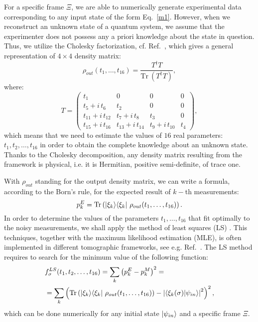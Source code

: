 \documentclass[aps,pra,reprint,groupedaddress,showkeys]{revtex4-1}
\renewcommand{\eqref}[1]{Eq.~\ref{#1}}
\newcommand{\tr}{{\mathrm{Tr}}}
\begin{document}
For a specific frame $\Xi$, we are able to numerically generate experimental data corresponding to any input state of the form \eqref{m1}. However, when we reconstruct an unknown state of a quantum system, we assume that the experimenter does not possess any a priori knowledge about the state in question. Thus, we utilize the Cholesky factorization, cf. Ref.~\cite{James2001,Altepeter2005,SedziakKacprowicz2020}, which gives a general representation of $4\times4$ density matrix:
\begin{equation}\label{m5}
\rho_{out} (t_1, \dots, t_{16}) = \frac{T^{\dagger} T}{\tr\: \left(T^{\dagger} T\right)},
\end{equation}
where:
\begin{equation}\label{m6}
T=\begin{pmatrix} t_1 & 0 & 0 &0 \\ t_5 + i\, t_6 & t_2 & 0 &0 \\  t_{11} + i \,t_{12} & t_7 + i\, t_8 & t_3 &0 \\ t_{15} + i\, t_{16} & t_{13} + i\, t_{14} & t_9 + i\, t_{10} & t_4 \end{pmatrix},
\end{equation}
which means that we need to estimate the values of $16$ real parameters: $t_1, t_2, \dots, t_{16}$ in order to obtain the complete knowledge about an unknown state. Thanks to the Cholesky decomposition, any density matrix resulting from the framework is physical, i.e. it is Hermitian, positive semi-definite, of trace one.

With $\rho_{out}$ standing for the output density matrix, we can write a formula, according to the Born's rule, for the expected result of $k-$th measurements:
\begin{equation}\label{m7}
p^{E}_k = \tr \left( \ket{\xi_k}\! \bra{\xi_k} \, \rho_{out} (t_1, \dots, t_{16}) \right).
\end{equation}
In order to determine the values of the parameters $t_1, \dots, t_{16}$ that fit optimally to the noisy measurements, we shall apply the method of least squares (LS) \cite{Opatrny1997}. This techniques, together with the maximum likelihood estimation (MLE), is often implemented in different tomographic frameworks, see e.g. Ref.~\cite{Acharya2019,SedziakKacprowicz2020}. The LS method requires to search for the minimum value of the following function:
\begin{equation}\label{m8}
\begin{aligned}
{}&f^{LS}_{\sigma} (t_1, t_2, \dots, t_{16}) = \sum_k \left( p^{E}_k  - p^{M}_k  \right)^2 = \\& =\sum_k \left(  \tr \left( \ket{\xi_k}\! \bra{\xi_k}  \, \rho_{out}(t_1, \dots, t_{16})  \right) - \left|\braket{ \xi_k (\sigma) | \psi_{in}}\right|^2 \right)^2,
\end{aligned}
\end{equation}
which can be done numerically for any initial state $\ket{\psi_{in}}$ and a specific frame $\Xi$.
\end{document}
